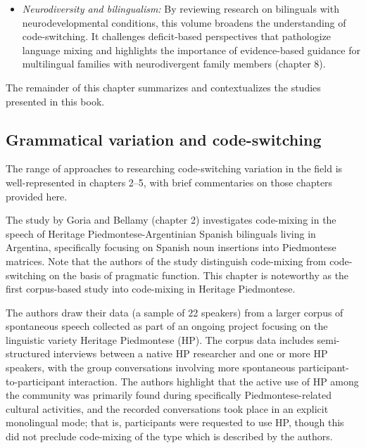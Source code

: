 \documentclass[output=paper]{langscibook}
\begin{document}
\begin{itemize}
\item \emph{Neurodiversity and bilingualism:} By reviewing research on bilinguals with neurodevelopmental conditions, this volume broadens the understanding of code-switching. It challenges deficit-based perspectives that pathologize language mixing and highlights the importance of evidence-based guidance for multilingual families with neurodivergent family members (chapter 8).
\end{itemize}

The remainder of this chapter summarizes and contextualizes the studies presented in this book.

\subsection{Grammatical variation and code-switching}

The range of approaches to researching code-switching variation in the field is well-represented in chapters 2--5, with brief commentaries on those chapters provided here.

The study by Goria and Bellamy (chapter 2) investigates code-mixing in the speech of Heritage Piedmontese-Argentinian Spanish bilinguals living in Argentina, specifically focusing on Spanish noun insertions into Piedmontese matrices. Note that the authors of the study distinguish code-mixing from code-switching on the basis of pragmatic function. This chapter is noteworthy as the first corpus-based study into code-mixing in Heritage Piedmontese.

The authors draw their data (a sample of 22 speakers) from a larger corpus of spontaneous speech collected as part of an ongoing project focusing on the linguistic variety Heritage Piedmontese (HP). The corpus data includes semi-structured interviews between a native HP researcher and one or more HP speakers, with the group conversations involving more spontaneous participant-to-participant interaction. The authors highlight that the active use of HP among the community was primarily found during specifically Piedmontese-related cultural activities, and the recorded conversations took place in an explicit monolingual mode; that is, participants were requested to use HP, though this did not preclude code-mixing of the type which is described by the authors.
\end{document}
